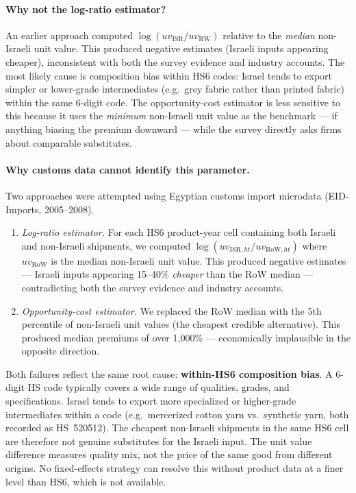 \documentclass[12pt]{article}
\begin{document}
\paragraph{Why not the log-ratio estimator?}
An earlier approach computed $\log(uv_{\mathrm{ISR}}/uv_{\mathrm{RW}})$
relative to the \emph{median} non-Israeli unit value. This produced
negative estimates (Israeli inputs appearing cheaper), inconsistent with
both the survey evidence and industry accounts. The most likely cause is
composition bias within HS6 codes: Israel tends to export simpler or
lower-grade intermediates (e.g.\ grey fabric rather than printed fabric)
within the same 6-digit code. The opportunity-cost estimator is less
sensitive to this because it uses the \emph{minimum} non-Israeli unit
value as the benchmark --- if anything biasing the premium downward ---
while the survey directly asks firms about comparable substitutes.

\paragraph{Why customs data cannot identify this parameter.}
Two approaches were attempted using Egyptian customs import microdata
(EID-Imports, 2005--2008).

\begin{enumerate}

\item \textit{Log-ratio estimator.}
For each HS6 product-year cell containing both Israeli and non-Israeli
shipments, we computed $\log(uv_{\mathrm{ISR},ht}/uv_{\mathrm{RoW},ht})$
where $uv_{\mathrm{RoW}}$ is the median non-Israeli unit value.
This produced negative estimates --- Israeli inputs appearing 15--40\%
\emph{cheaper} than the RoW median --- contradicting both the survey
evidence and industry accounts.

\item \textit{Opportunity-cost estimator.}
We replaced the RoW median with the 5th percentile of non-Israeli unit
values (the cheapest credible alternative). This produced median premiums
of over 1,000\% --- economically implausible in the opposite direction.

\end{enumerate}

Both failures reflect the same root cause: \textbf{within-HS6 composition
bias}. A 6-digit HS code typically covers a wide range of qualities, grades,
and specifications. Israel tends to export more specialized or higher-grade
intermediates within a code (e.g.\ mercerized cotton yarn vs.\ synthetic
yarn, both recorded as HS~520512). The cheapest non-Israeli shipments in the
same HS6 cell are therefore not genuine substitutes for the Israeli input.
The unit value difference measures quality mix, not the price of the same
good from different origins. No fixed-effects strategy can resolve this
without product data at a finer level than HS6, which is not available.
\end{document}
